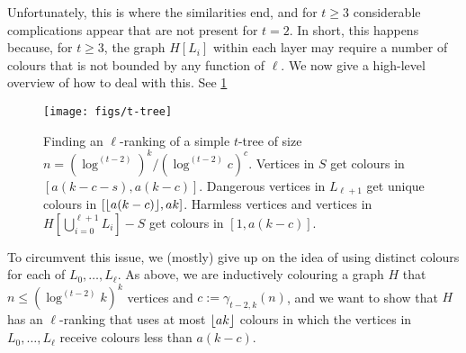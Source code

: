 \documentclass[kpfonts]{patmorin}
\theoremstyle{named}
\begin{document}
Unfortunately, this is where the similarities end, and for $t\ge 3$ considerable complications appear that are not present for $t=2$. In short, this happens because, for $t\ge 3$, the graph $H[L_i]$ within each layer may require a number of colours that is not bounded by any function of $\ell$.  We now give a high-level overview of how to deal with this.
See \cref{t-tree_fig}

\begin{figure}
  \begin{center}
    \texttt{[image: figs/t-tree]}
  \end{center}
  \caption{Finding an $\ell$-ranking of a simple $t$-tree of size $n=(\log^{(t-2)})^k/(\log^{(t-2)}c)^c$. Vertices in $S$ get colours in $[a(k-c-s),a(k-c)]$. Dangerous vertices in $L_{\ell+1}$ get unique colours in $[{\lfloor a(k-c) \rfloor},ak]$.  Harmless vertices and vertices in $H[\bigcup_{i=0}^{\ell+1} L_i]-S$ get colours in $[1,a(k-c)]$.}
  \label{t-tree_fig}
\end{figure}

To circumvent this issue, we (mostly) give up on the idea of using distinct colours for each of $L_0,\ldots,L_\ell$.  As above, we are inductively colouring a graph $H$ that $n\le (\log^{(t-2)} k)^k$ vertices and $c:=\gamma_{t-2,k}(n)$, and we want to show that $H$ has an $\ell$-ranking that uses at most ${\lfloor ak \rfloor}$ colours in which the vertices in $L_0,\ldots,L_{\ell}$ receive colours less than $a(k-c)$.
\end{document}
